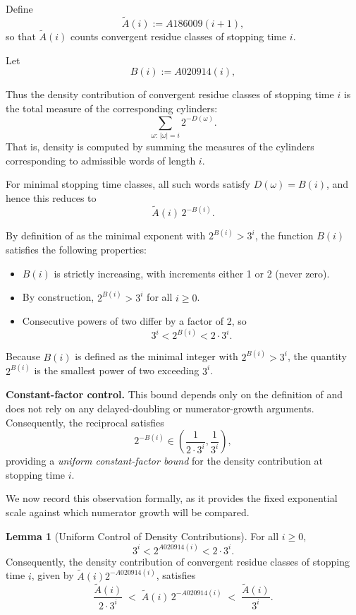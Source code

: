 \documentclass[12pt, oneside]{article}   	%
\numberwithin{equation}{section}          %
\theoremstyle{definition}
\newtheorem{lemma}[theorem]{Lemma}
\begin{document}
Define
\[
\widetilde A(i) := A186009(i+1),
\]
so that $\widetilde A(i)$ counts convergent residue classes of stopping time $i$.

Let
\[
B(i) := A020914(i),
\]

Thus the density contribution of convergent residue classes of stopping time $i$
is the total measure of the corresponding cylinders:
\[
\sum_{\omega:\,|\omega|=i} 2^{-D(\omega)}.
\]
That is, density is computed by summing the measures of the
cylinders corresponding to admissible words of length $i$.

For minimal stopping time classes, all such words satisfy
$D(\omega)=B(i)$, and hence this reduces to
\[
\widetilde A(i)\, 2^{-B(i)}.
\]

By definition of  as the minimal exponent with $2^{B(i)} > 3^i$, the function
$B(i)$ satisfies the following properties:
\begin{itemize}
    \item $B(i)$ is strictly increasing, with increments either 1 or 2 (never zero).
    \item By construction, $2^{B(i)} > 3^i$ for all $i \ge 0$.
    \item Consecutive powers of two differ by a factor of 2, so
    \[
    3^i < 2^{B(i)} < 2 \cdot 3^i.
    \]
\end{itemize}

Because $B(i)$ is defined as the minimal integer with $2^{B(i)} > 3^i$,
the quantity $2^{B(i)}$ is the smallest power of two exceeding $3^i$.

\noindent
\textbf{Constant-factor control.}
This bound depends only on the definition of  and does not rely on
any delayed-doubling or numerator-growth arguments. Consequently, the reciprocal satisfies
\[
2^{-B(i)} \in \left( \frac{1}{2 \cdot 3^i}, \frac{1}{3^i} \right),
\]
providing a \emph{uniform constant-factor bound} for the density contribution at stopping time $i$.

We now record this observation formally, as it provides the fixed exponential scale against
which numerator growth will be compared.

\begin{lemma}[Uniform Control of Density Contributions]
\label{lem:uniform-control}
For all $i \ge 0$,
\[
3^i < 2^{A020914(i)} < 2\cdot 3^i.
\]
Consequently, the density contribution of convergent residue classes of
stopping time $i$, given by \(\widetilde A(i) 2^{-A020914(i)}\), satisfies
\[
\frac{\widetilde A(i)}{2 \cdot 3^i}
\;<\;
\widetilde A(i)\,2^{-A020914(i)}
\;<\;
\frac{\widetilde A(i)}{3^i}.
\]
\end{lemma}
\end{document}
